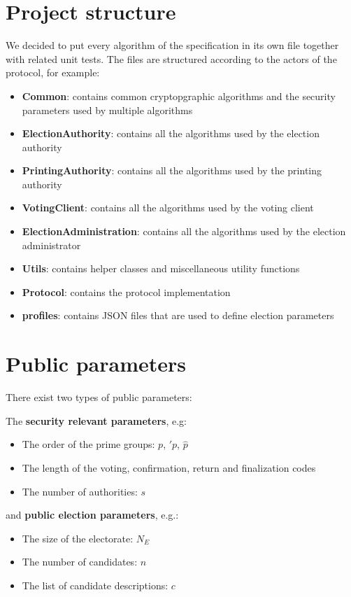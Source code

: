 \documentclass[a4paper,12pt]{report}
\begin{document}
\section{Project structure}
We decided to put every algorithm of the specification in its own file together with related unit tests. The files are structured according to the actors of the protocol, for example:

\begin{itemize}
	\item \textbf{Common}: contains common cryptopgraphic algorithms and the security parameters used by multiple algorithms
	\item \textbf{ElectionAuthority}: contains all the algorithms used by the election authority
	\item \textbf{PrintingAuthority}: contains all the algorithms used by the printing authority
	\item \textbf{VotingClient}: contains all the algorithms used by the voting client
	\item \textbf{ElectionAdministration}: contains all the algorithms used by the election administrator
	\item \textbf{Utils}: contains helper classes and miscellaneous utility functions
	\item \textbf{Protocol}: contains the protocol implementation
	\item \textbf{profiles}: contains JSON files that are used to define election parameters
\end{itemize}

\section{Public parameters}
There exist two types of public parameters:

The \textbf{security relevant parameters}, e.g:

\begin{itemize}
	\item The order of the prime groups: $p$, $\prime{p}$, $\hat{p}$
	\item The length of the voting, confirmation, return and finalization codes
	\item The number of authorities: $s$
\end{itemize}

and \textbf{public election parameters}, e.g.:

\begin{itemize}
	\item The size of the electorate: $N_E$
	\item The number of candidates: $n$
	\item The list of candidate descriptions: $c$
\end{itemize}
\end{document}
